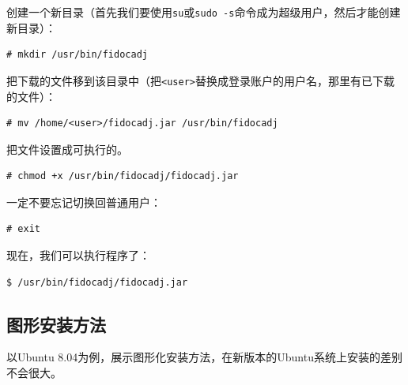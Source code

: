 \documentclass[10pt,a4paper,twoside]{scrreprt}
\begin{document}
创建一个新目录（首先我们要使用\lstinline!su!或\lstinline!sudo -s!命令成为超级用户，然后才能创建新目录）：

\begin{lstlisting}
# mkdir /usr/bin/fidocadj
\end{lstlisting}

把下载的文件移到该目录中（把\lstinline!<user>!替换成登录账户的用户名，那里有已下载的文件）：

\begin{lstlisting}
# mv /home/<user>/fidocadj.jar /usr/bin/fidocadj
\end{lstlisting}

把文件设置成可执行的。

\begin{lstlisting}
# chmod +x /usr/bin/fidocadj/fidocadj.jar
\end{lstlisting}

一定不要忘记切换回普通用户：

\begin{lstlisting}
# exit
\end{lstlisting}

现在，我们可以执行程序了：

\begin{lstlisting}
$ /usr/bin/fidocadj/fidocadj.jar
\end{lstlisting}

\subsection{图形安装方法}
\label{inst_grafica}
以Ubuntu 8.04为例，展示图形化安装方法，在新版本的Ubuntu系统上安装的差别不会很大。
\end{document}
